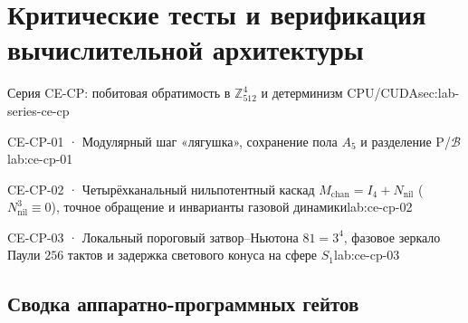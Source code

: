 



\chapter{Критические тесты и верификация вычислительной архитектуры}
\label{ch:compute-critical-experiments}

\begin{labseries}{Серия CE-CP: побитовая обратимость в $\mathbb{Z}_{512}^4$ и детерминизм CPU/CUDA}{sec:lab-series-ce-cp}
\begin{labrecord}{CE-CP-01 · Модулярный шаг «лягушка», сохранение пола $A_5$ и разделение $\mathrm{P}$/$\mathcal{B}$}{lab:ce-cp-01}

\end{labrecord}

\begin{labrecord}{CE-CP-02 · Четырёхканальный нильпотентный каскад \texorpdfstring{$M_{\mathrm{chan}} = I_4 + N_{\mathrm{nil}}$}{M\_chan} (\texorpdfstring{$N_{\mathrm{nil}}^3 \equiv 0$}{N\_nil\^3 = 0}), точное обращение и инварианты газовой динамики}{lab:ce-cp-02}

\end{labrecord}

\begin{labrecord}{CE-CP-03 · Локальный пороговый затвор--Ньютона \texorpdfstring{$81 = 3^4$}{81 = 3\^4}, фазовое зеркало Паули \texorpdfstring{$256$}{256} тактов и задержка светового конуса на сфере \texorpdfstring{$S_1$}{S\_1}}{lab:ce-cp-03}

\end{labrecord}
\end{labseries}

\section{Сводка аппаратно-программных гейтов}
\label{sec:compute-gates-summary}

